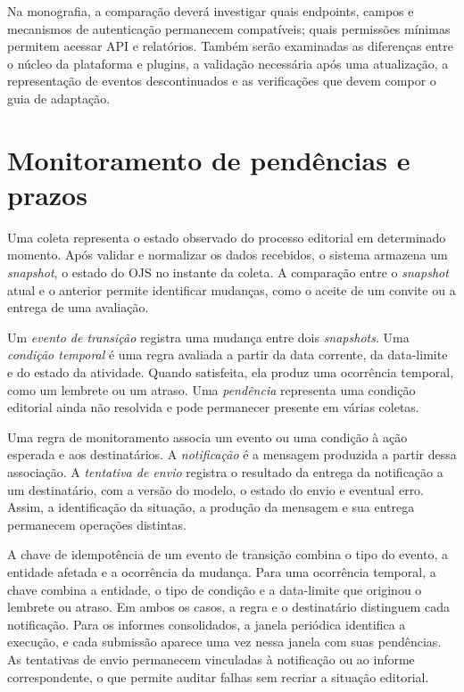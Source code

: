 Na monografia, a comparação deverá investigar quais endpoints, campos e mecanismos de autenticação permanecem compatíveis; quais permissões mínimas permitem acessar API e relatórios. Também serão examinadas as diferenças entre o núcleo da plataforma e plugins, a validação necessária após uma atualização, a representação de eventos descontinuados e as verificações que devem compor o guia de adaptação.

\section{Monitoramento de pendências e prazos}
\label{sec-fundteo-monitoramento}

Uma coleta representa o estado observado do processo editorial em determinado momento. Após validar e normalizar os dados recebidos, o sistema armazena um \textit{snapshot}, o estado do OJS no instante da coleta. A comparação entre o \textit{snapshot} atual e o anterior permite identificar mudanças, como o aceite de um convite ou a entrega de uma avaliação.

Um \emph{evento de transição} registra uma mudança entre dois \textit{snapshots}. Uma \emph{condição temporal} é uma regra avaliada a partir da data corrente, da data-limite e do estado da atividade. Quando satisfeita, ela produz uma ocorrência temporal, como um lembrete ou um atraso. Uma \emph{pendência} representa uma condição editorial ainda não resolvida e pode permanecer presente em várias coletas.

Uma regra de monitoramento associa um evento ou uma condição à ação esperada e aos destinatários. A \emph{notificação} é a mensagem produzida a partir dessa associação. A \emph{tentativa de envio} registra o resultado da entrega da notificação a um destinatário, com a versão do modelo, o estado do envio e eventual erro. Assim, a identificação da situação, a produção da mensagem e sua entrega permanecem operações distintas.

A chave de idempotência de um evento de transição combina o tipo do evento, a entidade afetada e a ocorrência da mudança. Para uma ocorrência temporal, a chave combina a entidade, o tipo de condição e a data-limite que originou o lembrete ou atraso. Em ambos os casos, a regra e o destinatário distinguem cada notificação. Para os informes consolidados, a janela periódica identifica a execução, e cada submissão aparece uma vez nessa janela com suas pendências. As tentativas de envio permanecem vinculadas à notificação ou ao informe correspondente, o que permite auditar falhas sem recriar a situação editorial.

